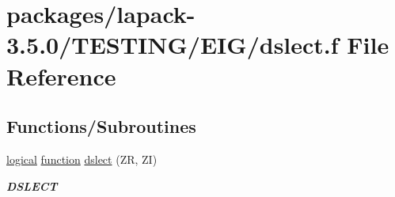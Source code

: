 \hypertarget{dslect_8f}{}\section{packages/lapack-\/3.5.0/\+T\+E\+S\+T\+I\+N\+G/\+E\+I\+G/dslect.f File Reference}
\label{dslect_8f}
\subsection*{Functions/\+Subroutines}
\begin{DoxyCompactItemize}
\item 
\hyperlink{tnc_8c_aa7b64cdf39500931f7b333343791a104}{logical} \hyperlink{afunc_8m_a7b5e596df91eadea6c537c0825e894a7}{function} \hyperlink{group__double__eig_gab8c1ed076508e5ae3b39e824e27790cc}{dslect} (Z\+R, Z\+I)
\begin{DoxyCompactList}\small\item\em {\bfseries D\+S\+L\+E\+C\+T} \end{DoxyCompactList}\end{DoxyCompactItemize}
